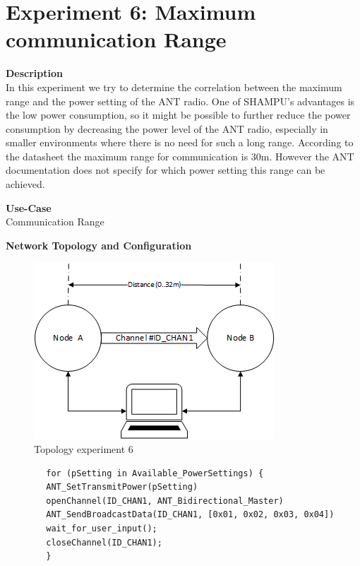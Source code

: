 \section{Experiment 6: Maximum communication Range}
\begin{description} 
	\item{\textbf{Description}} \hfill \\  In this experiment we try to determine the correlation between the maximum range and the power setting of the ANT radio. One of SHAMPU's advantages is the low power consumption, so it might be possible to further reduce the power consumption by decreasing the power level of the ANT radio, especially in smaller environments where there is no need for such a long range. According to the datasheet the maximum range for communication is 30m. However the ANT documentation does not specify for which power setting this range can be achieved. 
	
	\item{\textbf{Use-Case}} \hfill \\ Communication Range		
	\item{\textbf{Network Topology and Configuration}} \hfill \\ 
	\begin{figure}[h]
		\centering
		\includegraphics[scale=1]{content/images/exp6_topo.png}
		\caption{Topology experiment 6}
	\end{figure}
	
	\begin{code}[h]
		\begin{verbatim}
		for (pSetting in Available_PowerSettings) {
		ANT_SetTransmitPower(pSetting)
		openChannel(ID_CHAN1, ANT_Bidirectional_Master)
		ANT_SendBroadcastData(ID_CHAN1, [0x01, 0x02, 0x03, 0x04])
		wait_for_user_input();
		closeChannel(ID_CHAN1);
		}
		\end{verbatim}
		\caption{maximum communication range (Master)}\label{lst:mExp6}
	\end{code}
	

\end{description}
